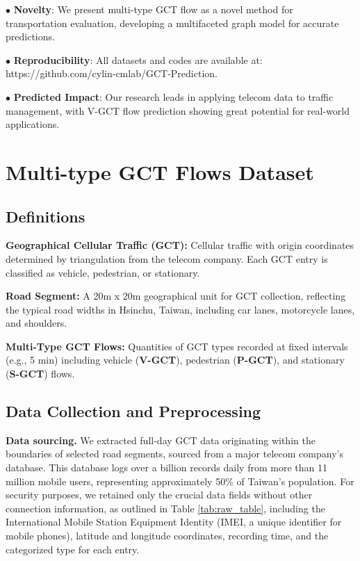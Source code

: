 \documentclass[letterpaper]{article} %
\begin{document}
$\bullet$ \textbf{Novelty}: We present multi-type GCT flow as a novel method for transportation evaluation, developing a multifaceted graph model for accurate predictions.

$\bullet$ \textbf{Reproducibility}: All datasets and codes are available at: https://github.com/cylin-cmlab/GCT-Prediction.

$\bullet$ \textbf{Predicted Impact}: Our research leads in applying telecom data to traffic management, with V-GCT flow prediction showing great potential for real-world applications.

\clearpage

\section{Multi-type GCT Flows Dataset}
\subsection{Definitions}

\noindent \textbf{Geographical Cellular Traffic (GCT):} Cellular traffic with origin coordinates determined by triangulation \cite{jiang2013review} from the telecom company. Each GCT entry is classified as vehicle, pedestrian, or stationary.

\noindent \textbf{Road Segment:} A 20m x 20m geographical unit for GCT collection, reflecting the typical road widths in Hsinchu, Taiwan, including car lanes, motorcycle lanes, and shoulders.

\noindent \textbf{Multi-Type GCT Flows:} Quantities of GCT types recorded at fixed intervals (e.g., 5 min) including vehicle (\textbf{V-GCT}), pedestrian (\textbf{P-GCT}), and stationary (\textbf{S-GCT}) flows.
\subsection{Data Collection and Preprocessing}
\textbf{Data sourcing.}
We extracted full-day GCT data originating within the boundaries of selected road segments, sourced from a major telecom company's database. This database logs over a billion records daily from more than 11 million mobile users, representing approximately 50\% of Taiwan's population. For security purposes, we retained only the crucial data fields without other connection information, as outlined in Table \ref{tab:raw_table}, including the International Mobile Station Equipment Identity (IMEI, a unique identifier for mobile phones), latitude and longitude coordinates, recording time, and the categorized type for each entry.
\end{document}
